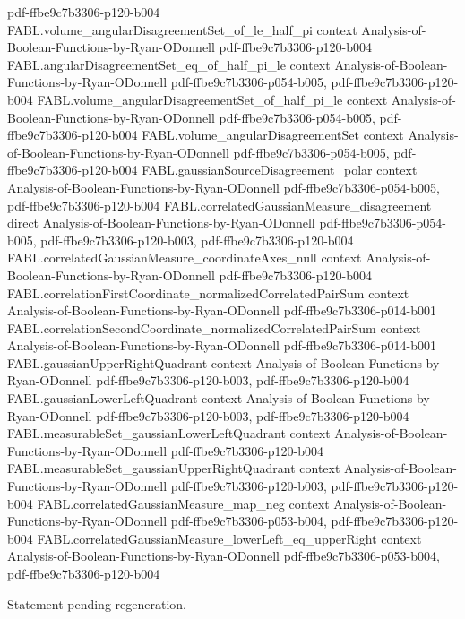 \begin{theorem}
  {pdf-ffbe9c7b3306-p120-b004}
\proofstep
  {FABL.volume_angularDisagreementSet_of_le_half_pi}
  {context}
  {Analysis-of-Boolean-Functions-by-Ryan-ODonnell}
  {pdf-ffbe9c7b3306-p120-b004}
\proofstep
  {FABL.angularDisagreementSet_eq_of_half_pi_le}
  {context}
  {Analysis-of-Boolean-Functions-by-Ryan-ODonnell}
  {pdf-ffbe9c7b3306-p054-b005,
    pdf-ffbe9c7b3306-p120-b004}
\proofstep
  {FABL.volume_angularDisagreementSet_of_half_pi_le}
  {context}
  {Analysis-of-Boolean-Functions-by-Ryan-ODonnell}
  {pdf-ffbe9c7b3306-p054-b005,
    pdf-ffbe9c7b3306-p120-b004}
\proofstep
  {FABL.volume_angularDisagreementSet}
  {context}
  {Analysis-of-Boolean-Functions-by-Ryan-ODonnell}
  {pdf-ffbe9c7b3306-p054-b005,
    pdf-ffbe9c7b3306-p120-b004}
\proofstep
  {FABL.gaussianSourceDisagreement_polar}
  {context}
  {Analysis-of-Boolean-Functions-by-Ryan-ODonnell}
  {pdf-ffbe9c7b3306-p054-b005,
    pdf-ffbe9c7b3306-p120-b004}
\proofstep
  {FABL.correlatedGaussianMeasure_disagreement}
  {direct}
  {Analysis-of-Boolean-Functions-by-Ryan-ODonnell}
  {pdf-ffbe9c7b3306-p054-b005,
    pdf-ffbe9c7b3306-p120-b003,
    pdf-ffbe9c7b3306-p120-b004}
\proofstep
  {FABL.correlatedGaussianMeasure_coordinateAxes_null}
  {context}
  {Analysis-of-Boolean-Functions-by-Ryan-ODonnell}
  {pdf-ffbe9c7b3306-p120-b004}
\proofstep
  {FABL.correlationFirstCoordinate_normalizedCorrelatedPairSum}
  {context}
  {Analysis-of-Boolean-Functions-by-Ryan-ODonnell}
  {pdf-ffbe9c7b3306-p014-b001}
\proofstep
  {FABL.correlationSecondCoordinate_normalizedCorrelatedPairSum}
  {context}
  {Analysis-of-Boolean-Functions-by-Ryan-ODonnell}
  {pdf-ffbe9c7b3306-p014-b001}
\proofstep
  {FABL.gaussianUpperRightQuadrant}
  {context}
  {Analysis-of-Boolean-Functions-by-Ryan-ODonnell}
  {pdf-ffbe9c7b3306-p120-b003,
    pdf-ffbe9c7b3306-p120-b004}
\proofstep
  {FABL.gaussianLowerLeftQuadrant}
  {context}
  {Analysis-of-Boolean-Functions-by-Ryan-ODonnell}
  {pdf-ffbe9c7b3306-p120-b003,
    pdf-ffbe9c7b3306-p120-b004}
\proofstep
  {FABL.measurableSet_gaussianLowerLeftQuadrant}
  {context}
  {Analysis-of-Boolean-Functions-by-Ryan-ODonnell}
  {pdf-ffbe9c7b3306-p120-b004}
\proofstep
  {FABL.measurableSet_gaussianUpperRightQuadrant}
  {context}
  {Analysis-of-Boolean-Functions-by-Ryan-ODonnell}
  {pdf-ffbe9c7b3306-p120-b003,
    pdf-ffbe9c7b3306-p120-b004}
\proofstep
  {FABL.correlatedGaussianMeasure_map_neg}
  {context}
  {Analysis-of-Boolean-Functions-by-Ryan-ODonnell}
  {pdf-ffbe9c7b3306-p053-b004,
    pdf-ffbe9c7b3306-p120-b004}
\proofstep
  {FABL.correlatedGaussianMeasure_lowerLeft_eq_upperRight}
  {context}
  {Analysis-of-Boolean-Functions-by-Ryan-ODonnell}
  {pdf-ffbe9c7b3306-p053-b004,
    pdf-ffbe9c7b3306-p120-b004}

Statement pending regeneration.
\end{theorem}

